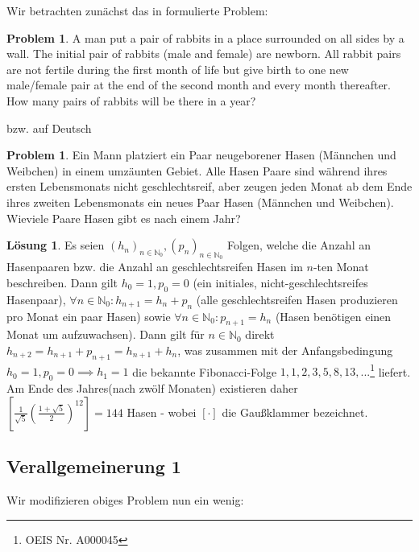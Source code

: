\documentclass{article}
\theoremstyle{plain} %
\theoremstyle{definition} %
\newtheorem{problem}[theorem]{Problem}
\newtheorem{solution}[theorem]{Lösung}
\begin{document}
Wir betrachten zunächst das in \cite[S. 46, Problem Nr. 57]{AlgoPuzzles} formulierte Problem:
\begin{problem} \label{rabbit1}
A man put a pair of rabbits in a place surrounded on all sides by a wall. The initial pair of rabbits (male and female) are newborn. All rabbit pairs are not fertile during the first month of life but give birth to one new male/female pair at the end of the second month and every month thereafter. How many pairs of rabbits will be there in a year?
\end{problem}
bzw. auf Deutsch
\begin{problem}
Ein Mann platziert ein Paar neugeborener Hasen (Männchen und Weibchen) in einem umzäunten Gebiet. Alle Hasen Paare sind während ihres ersten Lebensmonats nicht geschlechtsreif, aber zeugen jeden Monat ab dem Ende ihres zweiten Lebensmonats ein neues Paar Hasen (Männchen und Weibchen). Wieviele Paare Hasen gibt es nach einem Jahr?
\end{problem}
\begin{solution}
  Es seien $(h_n)_{n \in \mathbb{N}_0}, (p_n)_{n \in \mathbb{N}_0}$ Folgen, welche die Anzahl an Hasenpaaren bzw. die Anzahl an geschlechtsreifen Hasen im $n$-ten Monat beschreiben.
  Dann gilt $h_0 = 1, p_0 = 0$ (ein initiales, nicht-geschlechtsreifes Hasenpaar), $\forall n \in \mathbb{N}_0 : h_{n+1} = h_n + p_n$ (alle geschlechtsreifen Hasen produzieren pro Monat ein paar Hasen) sowie $\forall n \in \mathbb{N}_0 : p_{n+1} = h_n$ (Hasen benötigen einen Monat um aufzuwachsen). Dann gilt für $n \in \mathbb{N}_0$ direkt $h_{n+2} = h_{n+1} + p_{n+1} = h_{n+1} + h_n$, was zusammen mit der Anfangsbedingung $h_0 = 1, p_0 = 0 \implies h_1 = 1$ die bekannte Fibonacci-Folge $1,1,2,3,5,8,13,...$\footnote{OEIS Nr. A000045} liefert.
  Am Ende des Jahres(nach zwölf Monaten) existieren daher $[\frac{1}{\sqrt{5}} (\frac{1 + \sqrt{5}}{2})^{12}] = 144$ Hasen - wobei $[\cdot]$ die Gaußklammer bezeichnet.
\end{solution}

\subsection{Verallgemeinerung 1}

Wir modifizieren obiges Problem nun ein wenig:
\end{document}
